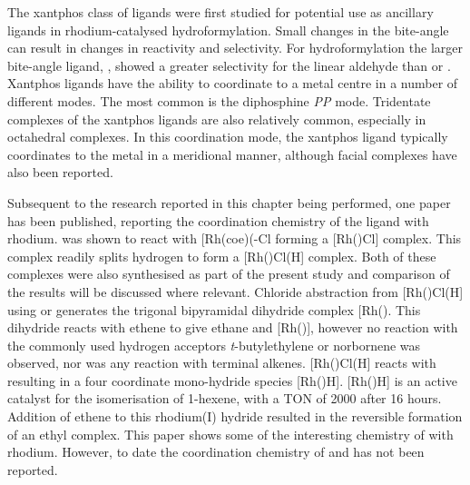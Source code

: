 
The xantphos class of ligands were first studied for potential use as ancillary ligands in rhodium-catalysed hydroformylation\cite{Kranenburg1995}.  Small changes in the bite-angle can result in changes in reactivity and selectivity.  For hydroformylation the larger bite-angle ligand, \Phxantphos{}, showed a greater selectivity for the linear aldehyde than \Phsixantphos{} or \Phthixantphos{}.  Xantphos ligands have the ability to coordinate to a metal centre in a number of different modes.  The most common is the diphosphine \dento{}\emph{PP\textprime} mode.  Tridentate \POP{} complexes of the xantphos ligands are also relatively common, especially in octahedral complexes.  In this \POP{} coordination mode, the xantphos ligand typically coordinates to the metal in a meridional manner, although facial complexes have also been reported.\cite{Dallanegra2012, Pawley2012}  

Subsequent to the research reported in this chapter being performed, one paper has been published, reporting the coordination chemistry of the \tBuxantphos{} ligand with rhodium.\cite{Haibach2013}  \tBuXantphos{} was shown to react with [Rh(coe)(\hapto{}-Cl\ce{]2} forming a [Rh(\tBuxantphosk)Cl] complex.  This complex readily splits hydrogen to form a [Rh(\tBuxantphosk)Cl(H] complex.  Both of these complexes were also synthesised as part of the present study and comparison of the results will be discussed where relevant.  Chloride abstraction from  [Rh(\tBuxantphosk)Cl(H] using  or  generates the trigonal bipyramidal dihydride complex [Rh(\tBuxantphosk)\ce{(H)2]+}.  This dihydride reacts with ethene to give ethane and [Rh(\tBuxantphosk)], however no reaction with the commonly used hydrogen acceptors \emph{t}-butylethylene or norbornene was observed, nor was any reaction with terminal alkenes.  [Rh(\tBuxantphosk)Cl(H] reacts with  resulting in a four coordinate mono-hydride species [Rh(\tBuxantphos)H].  [Rh(\tBuxantphos)H] is an active catalyst for the isomerisation of 1-hexene, with a TON of 2000 after 16 hours.  Addition of ethene to this rhodium(I) hydride resulted in the reversible formation of an ethyl complex.  This paper shows some of the interesting chemistry of \tBuxantphos{} with rhodium.  However, to date the coordination chemistry of \tBusixantphos{} and \tButhixantphos{} has not been reported.  

